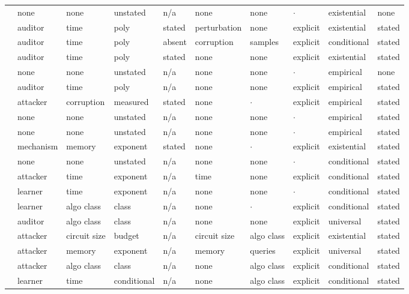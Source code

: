 \begin{landscape}
\begin{longtable}{rlllllllll}
\cite{VG20} & none & none & unstated & n/a & none & none & $\cdot$ & existential & none \\
\cite{KKOSVZ24} & auditor & time & poly & stated & perturbation & none & explicit & existential & stated \\
\cite{GSVV25} & auditor & time & poly & absent & corruption & samples & explicit & conditional & stated \\
\cite{GKVZ22} & auditor & time & poly & stated & none & none & explicit & existential & stated \\
\cite{AKKTARXLNP25} & none & none & unstated & n/a & none & none & $\cdot$ & empirical & none \\
\cite{DGMRLW24} & auditor & time & poly & n/a & none & none & explicit & empirical & stated \\
\cite{RT23} & attacker & corruption & measured & stated & none & $\cdot$ & explicit & empirical & stated \\
\cite{KJZXKOS25} & none & none & unstated & n/a & none & none & $\cdot$ & empirical & stated \\
\cite{PMSW18} & none & none & unstated & n/a & none & none & $\cdot$ & empirical & stated \\
\cite{KMNS21} & mechanism & memory & exponent & stated & none & $\cdot$ & explicit & existential & stated \\
\cite{AGK22} & none & none & unstated & n/a & none & none & $\cdot$ & conditional & stated \\
\cite{BRSV17} & attacker & time & exponent & n/a & time & none & explicit & conditional & stated \\
\cite{DLSW25} & learner & time & exponent & n/a & none & none & $\cdot$ & conditional & stated \\
\cite{BAHSWZ22} & learner & algo class & class & n/a & none & $\cdot$ & explicit & conditional & stated \\
\cite{BHKKMP16} & auditor & algo class & class & n/a & none & none & explicit & universal & stated \\
\cite{BJRZ24} & attacker & circuit size & budget & n/a & circuit size & algo class & explicit & existential & stated \\
\cite{GZ19} & attacker & memory & exponent & n/a & memory & queries & explicit & universal & stated \\
\cite{BBHLS21} & attacker & algo class & class & n/a & none & algo class & explicit & conditional & stated \\
\cite{BRST21} & learner & time & conditional & n/a & none & algo class & explicit & conditional & stated \\

\end{longtable}
\end{landscape}
